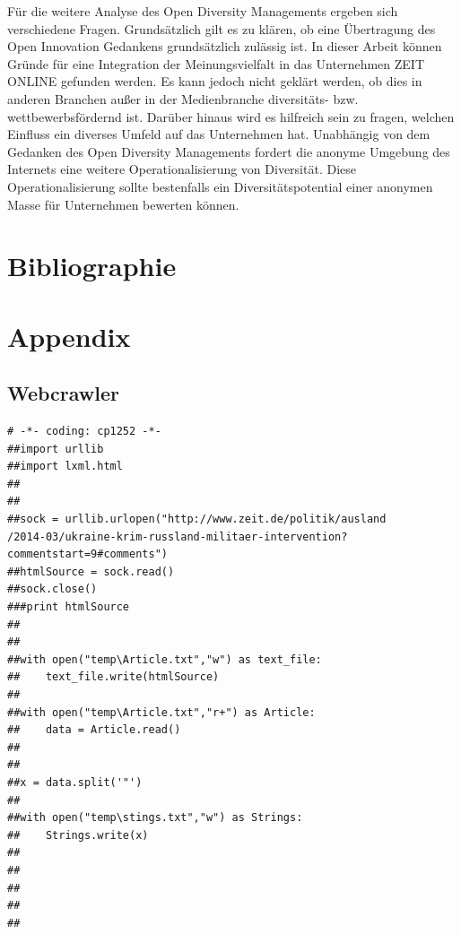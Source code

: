 \documentclass[12pt,a4paper,oneside]{article}
\begin{document}
\begin{titlepage}
\begin{flushleft}
Für die weitere Analyse des Open Diversity Managements ergeben sich verschiedene Fragen. Grundsätzlich gilt es zu klären, ob eine Übertragung des Open Innovation Gedankens grundsätzlich zulässig ist. In dieser Arbeit können Gründe für eine Integration der Meinungsvielfalt in das Unternehmen ZEIT ONLINE gefunden werden. Es kann jedoch nicht geklärt werden, ob dies in anderen Branchen außer in der Medienbranche diversitäts- bzw. wettbewerbsfördernd ist. Darüber hinaus wird es hilfreich sein zu fragen, welchen Einfluss ein diverses Umfeld auf das Unternehmen hat. Unabhängig von dem Gedanken des Open Diversity Managements fordert die anonyme Umgebung des Internets eine weitere Operationalisierung von Diversität. Diese Operationalisierung sollte bestenfalls ein Diversitätspotential einer anonymen Masse für Unternehmen bewerten können.



\newpage
\section{Bibliographie}





\normalsize
\newpage
\section{Appendix}
\subsection{Webcrawler}
\begin{verbatim}
# -*- coding: cp1252 -*-
##import urllib
##import lxml.html
##
##
##sock = urllib.urlopen("http://www.zeit.de/politik/ausland
/2014-03/ukraine-krim-russland-militaer-intervention?
commentstart=9#comments") 
##htmlSource = sock.read()                            
##sock.close()                                       
###print htmlSource
##
##
##with open("temp\Article.txt","w") as text_file:
##    text_file.write(htmlSource)
##
##with open("temp\Article.txt","r+") as Article:
##    data = Article.read()
##    
##
##x = data.split('"')
##
##with open("temp\stings.txt","w") as Strings:
##    Strings.write(x)
##
##
##    
##    
##    
    

\end{verbatim}
\end{flushleft}
\end{titlepage}
\end{document}
